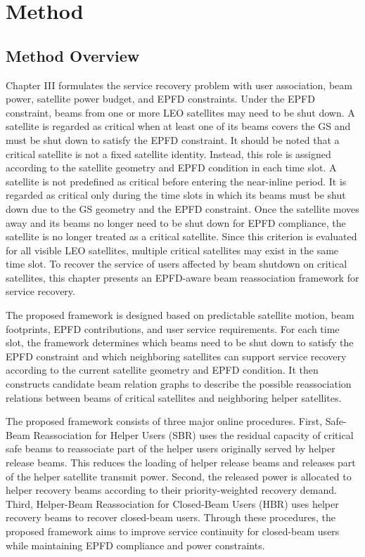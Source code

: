 

\section{Method}
\label{sec:chapter4}

\subsection{Method Overview}

Chapter III formulates the service recovery problem with user association, beam power, satellite power budget, and EPFD constraints. Under the EPFD constraint, beams from one or more LEO satellites may need to be shut down. A satellite is regarded as critical when at least one of its beams covers the GS and must be shut down to satisfy the EPFD constraint. It should be noted that a critical satellite is not a fixed satellite identity. Instead, this role is assigned according to the satellite geometry and EPFD condition in each time slot. A satellite is not predefined as critical before entering the near-inline period. It is regarded as critical only during the time slots in which its beams must be shut down due to the GS geometry and the EPFD constraint. Once the satellite moves away and its beams no longer need to be shut down for EPFD compliance, the satellite is no longer treated as a critical satellite. Since this criterion is evaluated for all visible LEO satellites, multiple critical satellites may exist in the same time slot. To recover the service of users affected by beam shutdown on critical satellites, this chapter presents an EPFD-aware beam reassociation framework for service recovery.

The proposed framework is designed based on predictable satellite motion, beam footprints, EPFD contributions, and user service requirements. For each time slot, the framework determines which beams need to be shut down to satisfy the EPFD constraint and which neighboring satellites can support service recovery according to the current satellite geometry and EPFD condition. It then constructs candidate beam relation graphs to describe the possible reassociation relations between beams of critical satellites and neighboring helper satellites.

The proposed framework consists of three major online procedures. First, Safe-Beam Reassociation for Helper Users (SBR) uses the residual capacity of critical safe beams to reassociate part of the helper users originally served by helper release beams. This reduces the loading of helper release beams and releases part of the helper satellite transmit power. Second, the released power is allocated to helper recovery beams according to their priority-weighted recovery demand. Third, Helper-Beam Reassociation for Closed-Beam Users (HBR) uses helper recovery beams to recover closed-beam users. Through these procedures, the proposed framework aims to improve service continuity for closed-beam users while maintaining EPFD compliance and power constraints.


